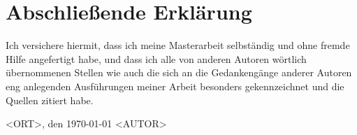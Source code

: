 
\newpage
\section*{Abschließende Erklärung} 

Ich versichere hiermit, dass ich meine Masterarbeit selbständig und ohne fremde Hilfe angefertigt habe, und dass ich alle von anderen Autoren wörtlich übernommenen Stellen wie auch die sich an die Gedankengänge anderer Autoren eng anlegenden Ausführungen meiner Arbeit besonders gekennzeichnet und die Quellen zitiert habe.

\vspace*{3cm}
\noindent <ORT>, den \today \hspace*{2cm} <AUTOR>
